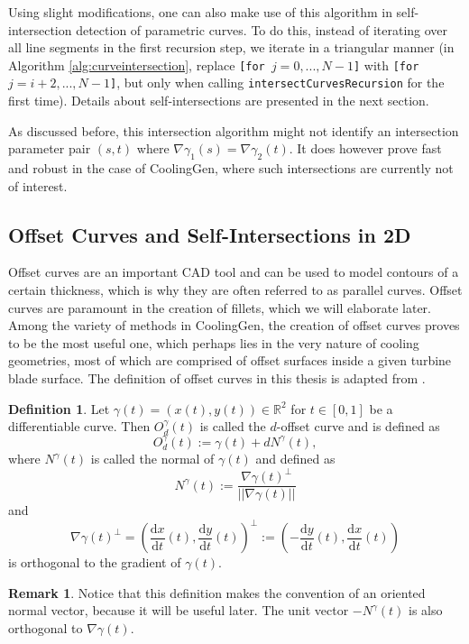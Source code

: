 \documentclass[a4paper, 11pt]{report}
\theoremstyle{definition}
\newtheorem{definition}{Definition}[section]
\newtheorem*{remark}{Remark}
\newcommand{\derivative}[2]{\frac{\textrm{d}{#1}}{\textrm{d}{#2}}}
\begin{document}
	Using slight modifications, one can also make use of this algorithm in self-intersection detection of parametric curves. To do this, instead of iterating over all line segments in the first recursion step, we iterate in a triangular manner (in Algorithm \ref{alg:curveintersection}, replace \texttt{[for $j = 0, ..., N-1$]} with \texttt{[for $j = i+2, ..., N-1$]}, but only when calling \texttt{intersectCurvesRecursion} for the first time). Details about self-intersections are presented in the next section.

	As discussed before, this intersection algorithm might not identify an intersection parameter pair $(s,t)$ where $\nabla \gamma_1(s) = \nabla \gamma_2(t)$. It does however prove fast and robust in the case of CoolingGen, where such intersections are currently not of interest.

\subsection{Offset Curves and Self-Intersections in 2D}\label{sec:offsetcurves}
	Offset curves are an important CAD tool and can be used to model contours of a certain thickness, which is why they are often referred to as parallel curves. Offset curves are paramount in the creation of fillets, which we will elaborate later. Among the variety of methods in CoolingGen, the creation of offset curves proves to be the most useful one, which perhaps lies in the very nature of cooling geometries, most of which are comprised of offset surfaces inside a given turbine blade surface. The definition of offset curves in this thesis is adapted from \cite{Elber1997}.

	\begin{definition}\label{def:offseteasy}
		Let $\gamma(t) = (x(t), y(t)) \in \mathbb{R}^2$ for $t\in[0,1]$ be a differentiable curve. Then $O^\gamma_d(t)$ is called the $d$-offset curve and is defined as
			$$ O^\gamma_d(t) := \gamma(t) + dN^\gamma(t),$$
		where $N^\gamma(t)$ is called the normal of $\gamma(t)$ and defined as
			$$N^\gamma(t) := \frac{\nabla\gamma(t)^\perp}{||\nabla\gamma(t)||}$$
		and
			$$\nabla\gamma(t)^\perp = \left(\derivative{x}{t}(t), \derivative{y}{t}(t)\right)^\perp := \left(-\derivative{y}{t}(t), \derivative{x}{t}(t)\right)$$
		is orthogonal to the gradient of $\gamma(t)$.
	\end{definition}

	\begin{remark}
		Notice that this definition makes the convention of an oriented normal vector, because it will be useful later. The unit vector $-N^\gamma(t)$ is also orthogonal to $\nabla \gamma(t)$.
	\end{remark}
\end{document}

